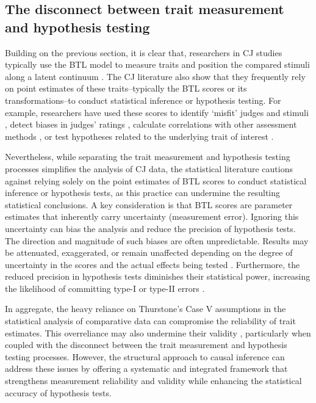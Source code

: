 \documentclass[
  authoryear,
  review,
  1p]{elsarticle}
\begin{document}
\subsection{The disconnect between trait measurement and hypothesis
testing}\label{sec-theory-issue2}

Building on the previous section, it is clear that, researchers in CJ
studies typically use the BTL model to measure traits and position the
compared stimuli along a latent continuum \citep{Thurstone_1927b}. The
CJ literature also show that they frequently rely on point estimates of
these traits--typically the BTL scores or its transformations--to
conduct statistical inference or hypothesis testing. For example,
researchers have used these scores to identify `misfit' judges and
stimuli \citep{Pollitt_2012b, vanDaal_et_al_2016, Goossens_et_al_2018},
detect biases in judges' ratings
\citep{Pollitt_et_al_2003, Pollitt_2012b}, calculate correlations with
other assessment methods \citep{Goossens_et_al_2018, Bouwer_et_al_2023},
or test hypotheses related to the underlying trait of interest
\citep{Casalicchio_et_al_2015, Bramley_et_al_2019, Boonen_et_al_2020, Bouwer_et_al_2023, vanDaal_et_al_2017, Jones_et_al_2019, Gijsen_et_al_2021}.

Nevertheless, while separating the trait measurement and hypothesis
testing processes simplifies the analysis of CJ data, the statistical
literature cautions against relying solely on the point estimates of BTL
scores to conduct statistical inference or hypothesis tests, as this
practice can undermine the resulting statistical conclusions. A key
consideration is that BTL scores are parameter estimates that inherently
carry uncertainty (measurement error). Ignoring this uncertainty can
bias the analysis and reduce the precision of hypothesis tests. The
direction and magnitude of such biases are often unpredictable. Results
may be attenuated, exaggerated, or remain unaffected depending on the
degree of uncertainty in the scores and the actual effects being tested
\citep{McElreath_2020, Kline_et_al_2023, Hoyle_et_al_2023}. Furthermore,
the reduced precision in hypothesis tests diminishes their statistical
power, increasing the likelihood of committing type-I or type-II errors
\citep{McElreath_2020}.

In aggregate, the heavy reliance on Thurstone's Case V assumptions in
the statistical analysis of comparative data can compromise the
reliability of trait estimates. This overreliance may also undermine
their validity \citep{Perron_et_al_2015}, particularly when coupled with
the disconnect between the trait measurement and hypothesis testing
processes. However, the structural approach to causal inference can
address these issues by offering a systematic and integrated framework
that strengthens measurement reliability and validity while enhancing
the statistical accuracy of hypothesis tests.
\end{document}
